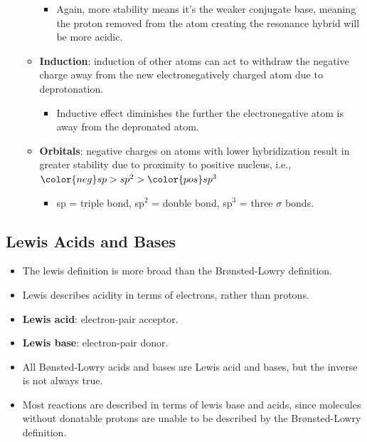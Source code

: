 \documentclass[12pt,a4paper]{article}
\begin{document}
\begin{itemize}
\begin{itemize}
\begin{itemize}
                \item Again, more stability means it's the weaker conjugate base, meaning the proton removed from the atom creating the resonance hybrid will be more acidic.
            \end{itemize}
        \item \textbf{Induction}: induction of other atoms can act to withdraw the negative charge away from the new electronegatively charged atom due to deprotonation.
            \begin{itemize}
                \item Inductive effect diminishes the further the electronegative atom is away from the depronated atom.
            \end{itemize}
        \item \textbf{Orbitals}: negative charges on atoms with lower hybridization result in greater stability due to proximity to positive nucleus, i.e., \({\color{neg}sp} > sp^2 > {\color{pos}sp^3}\)
            \begin{itemize}
                \item sp = triple bond, sp\(^{2}\) = double bond, sp\(^{3}\) = three $\sigma$ bonds.
            \end{itemize}
    \end{itemize}
\end{itemize}

\subsection{Lewis Acids and Bases}
\begin{itemize}
    \item The lewis definition is more broad than the Br{\o}nsted-Lowry definition.
    \item Lewis describes acidity in terms of {\color{o-Sun}electrons}, rather than protons.
    \item \textbf{Lewis acid}: electron-pair {\color{o-Sun}acceptor}.
    \item \textbf{Lewis base}: electron-pair {\color{o-Sun}donor}.
    \item All B{\o}nsted-Lowry acids and bases are Lewis acid and bases, but the inverse is not always true.
    \item Most reactions are described in terms of lewis base and acids, since molecules without donatable protons are unable to be described by the Br{\o}nsted-Lowry definition.
\end{itemize}
\end{document}
